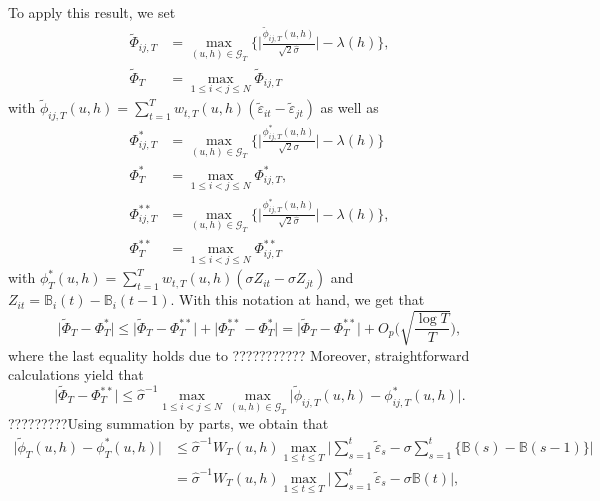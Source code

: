 \documentclass[a4paper,12pt]{article}
\numberwithin{equation}{section}
\begin{document}
To apply this result, we set
\begin{align*}
\widetilde{\Phi}_{ij,T} & = \max_{(u,h) \in \mathcal{G}_T} \Big\{ \Big|\frac{\widetilde{\phi}_{ij,T}(u,h)}{\sqrt{2}\widehat{\sigma}}\Big| - \lambda(h) \Big\},\\
\widetilde{\Phi}_T & = \max_{1\le i < j \le N} \widetilde{\Phi}_{ij,T}
\end{align*}
with $\widetilde{\phi}_{ij,T}(u,h) = \sum\nolimits_{t=1}^T w_{t,T}(u,h) (\widetilde{\varepsilon}_{it} - \widetilde{\varepsilon}_{jt})$ as well as 
\begin{align*}
\Phi_{ij,T}^* & = \max_{(u,h) \in \mathcal{G}_T} \Big\{ \Big|\frac{\phi_{ij,T}^*(u,h)}{\sqrt{2}\sigma}\Big| - \lambda(h) \Big\} \\
\Phi_T^* &= \max_{1\le i < j \le N} \Phi^*_{ij,T},\\
\Phi_{ij,T}^{**} & = \max_{(u,h) \in \mathcal{G}_T} \Big\{ \Big|\frac{\phi_{ij,T}^*(u,h)}{\sqrt{2}\widehat{\sigma}}\Big| - \lambda(h) \Big\},\\
\Phi_T^{**} &= \max_{1\le i < j \le N} \Phi^{**}_{ij,T}
\end{align*}
with $\phi_T^*(u,h) = \sum\nolimits_{t=1}^T w_{t,T}(u,h) (\sigma Z_{it} - \sigma Z_{jt})$ and $Z_{it} = \mathbb{B}_i(t) - \mathbb{B}_i(t-1)$. With this notation at hand, we get that 
\begin{equation}\label{eq-strongapprox-equality-bound1}
\big| \widetilde{\Phi}_T - \Phi_T^* \big| \le \big| \widetilde{\Phi}_T - \Phi_T^{**} \big| + \big| \Phi_T^{**} - \Phi_T^{*} \big| = \big| \widetilde{\Phi}_T - \Phi_T^{**} \big| + O_p \Big( \sqrt{\frac{\log T}{T}} \Big), 
\end{equation}
where the last equality holds due to ???????????
Moreover, straightforward calculations yield that 
\[ \big| \widetilde{\Phi}_T - \Phi_T^{**} \big| \le \widehat{\sigma}^{-1} \max_{1\le i<j \le N} \max_{(u,h) \in \mathcal{G}_T} \big| \widetilde{\phi}_{ij,T}(u,h) - \phi_{ij,T}^*(u,h) \big|. \]
?????????Using summation by parts,
we obtain that 
\begin{align*}
\big| \widetilde{\phi}_T(u,h) - \phi_T^*(u,h) \big| 
 & \le \widehat{\sigma}^{-1} W_T(u,h) \max_{1 \le t \le T} \Big| \sum\limits_{s=1}^t \widetilde{\varepsilon}_s - \sigma \sum\limits_{s=1}^t \big\{ \mathbb{B}(s) - \mathbb{B}(s-1) \big\} \Big| \\
 & = \widehat{\sigma}^{-1} W_T(u,h) \max_{1 \le t \le T} \Big| \sum\limits_{s=1}^t \widetilde{\varepsilon}_s - \sigma \mathbb{B}(t) \Big|,
\end{align*}
\end{document}
